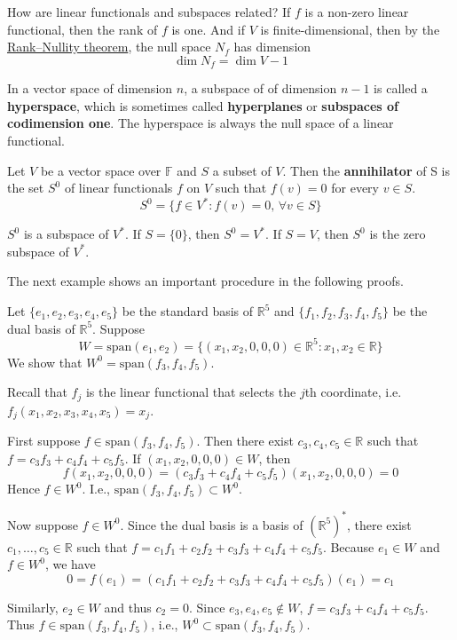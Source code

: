 How are linear functionals and subspaces related? If $f$ is a non-zero linear functional, then the rank of $f$ is one. And if $V$ is finite-dimensional, then by the \hyperref[thm:rank-null]{Rank–Nullity theorem}, the null space $N_f$ has dimension
\[
	\dim N_f = \dim V - 1
\]

In a vector space of dimension $n$, a subspace of of dimension $n-1$ is called a \textbf{hyperspace}, which is sometimes called \textbf{hyperplanes} or \textbf{subspaces of codimension one}. The hyperspace is always the null space of a linear functional.

\begin{definition}[Annihilator]
	Let $V$ be a vector space over $\mathbb{F}$ and $S$ a subset of $V$. Then the \textbf{annihilator} of S is the set $S^0$ of linear functionals $f$ on $V$ such that $f(v) = 0$ for every $v \in S$.
	\[
		S^0 = \{ f \in V^\ast : f(v) = 0, \, \forall v \in S \}
	\]
\end{definition}

$S^0$ is a subspace of $V^\ast$. If $S = \{ 0 \}$, then $S^0 = V^\ast$. If $S = V$, then $S^0$ is the zero subspace of $V^\ast$.

The next example shows an important procedure in the following proofs.

\begin{example}
	Let $\{ e_1, e_2, e_3, e_4, e_5 \}$ be the standard basis of $\mathbb{R}^5$ and $\{ f_1, f_2, f_3, f_4, f_5 \}$ be the dual basis of $\mathbb{R}^5$. Suppose
	\[
		W = \text{span}(e_1, e_2) = \{ (x_1, x_2, 0, 0, 0)  \in \mathbb{R}^5 : x_1, x_2 \in \mathbb{R} \}
	\]
	We show that $W^0 = \text{span}(f_3, f_4, f_5)$.

	Recall that $f_j$ is the linear functional that selects the $j$th coordinate, i.e. $f_j(x_1, x_2, x_3, x_4, x_5) = x_j$.

	First suppose $f \in \text{span}(f_3, f_4, f_5)$. Then there exist $c_3, c_4, c_5 \in \mathbb{R}$ such that $f = c_3 f_3 + c_4 f_4 + c_5 f_5$. If $(x_1, x_2, 0, 0, 0) \in W$, then 
	\[
		f(x_1, x_2, 0, 0, 0) = (c_3 f_3 + c_4 f_4 + c_5 f_5)(x_1, x_2, 0, 0, 0) = 0
	\]
	Hence $f \in W^0$. I.e., $\text{span}(f_3, f_4, f_5) \subset W^0$.

	Now suppose $f \in W^0$. Since the dual basis is a basis of $(\mathbb{R}^5)^\ast$, there exist $c_1, \ldots, c_5 \in \mathbb{R}$ such that $f = c_1 f_1 + c_2 f_2 + c_3 f_3 + c_4 f_4 + c_5 f_5$. Because $e_1 \in W$ and $f \in W^0$, we have
	\[
		0 = f(e_1) = (c_1 f_1 + c_2 f_2 + c_3 f_3 + c_4 f_4 + c_5 f_5)(e_1) = c_1
	\]

	Similarly, $e_2 \in W$ and thus $c_2 = 0$. Since $e_3, e_4, e_5 \notin W$, $f = c_3 f_3 + c_4 f_4 + c_5 f_5$. Thus $f \in \text{span}(f_3, f_4, f_5)$, i.e., $W^0 \subset \text{span}(f_3, f_4, f_5)$.
\end{example}

